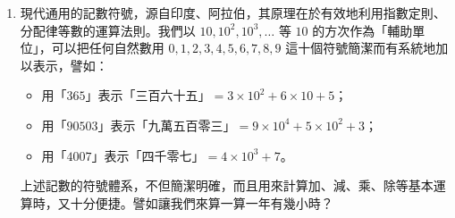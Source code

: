\begin{example}
\begin{enumerate}[(1)]
  \item 現代通用的記數符號，源自印度、阿拉伯，其原理在於有效地利用指數定則、分配律等數的運算法則。我們以 $10, 10^2, 10^3, \dots$ 等 $10$ 的方次作為「輔助單位」，可以把任何自然數用 $0, 1, 2, 3, 4, 5, 6, 7, 8, 9$ 這十個符號簡潔而有系統地加以表示，譬如：
  \begin{itemize}
    \item 用「$365$」表示「三百六十五」$= 3 \times 10^2 + 6 \times 10 + 5$；
    \item 用「$90503$」表示「九萬五百零三」$= 9 \times 10^4 + 5 \times 10^2 + 3$；
    \item 用「$4007$」表示「四千零七」$= 4 \times 10^3 + 7$。
  \end{itemize}
  上述記數的符號體系，不但簡潔明確，而且用來計算加、減、乘、除等基本運算時，又十分便捷。譬如讓我們來算一算一年有幾小時？


\end{enumerate}
\end{example}
